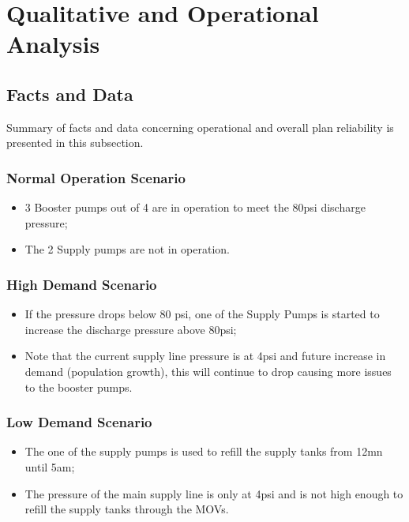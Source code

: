 %

\section{Qualitative and Operational Analysis}
\label{42}
\subsection{Facts and Data}
Summary of facts and data concerning operational and overall plan reliability is presented in this subsection.

\subsubsection{Normal Operation Scenario}
\begin{itemize}
\item 3 Booster pumps out of 4 are in operation to meet the 80psi discharge pressure;
 
\item The 2 Supply pumps are not in operation.
\end{itemize}

\subsubsection{High Demand Scenario}

\begin{itemize}
	\item If the pressure drops below 80 psi, one of the Supply Pumps is started to increase the discharge pressure above 80psi;
	
	\item Note that the current supply line pressure is at 4psi and future increase in demand (population growth), this will continue to drop causing more issues to the booster pumps.
\end{itemize}

\subsubsection{Low Demand Scenario}

\begin{itemize}
	\item The one of the supply pumps is used to refill the supply tanks from 12mn until 5am;

\item The pressure of the main supply line is only at 4psi and is not high enough to refill the supply tanks through the MOVs.

\end{itemize}

